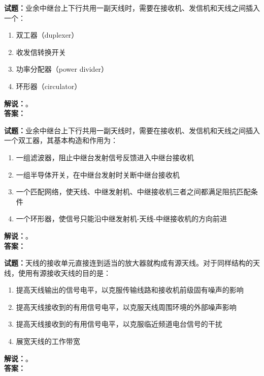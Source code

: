 \documentclass{ctexbook}
\begin{document}
\bigskip




\noindent\textbf{试题：}业余中继台上下行共用一副天线时，需要在接收机、发信机和天线之间插入一个：
\begin{enumerate}[leftmargin=3em]
\item 双工器（duplexer）
\item 收发信转换开关
\item 功率分配器（power divider）
\item 环形器（circulator）
\end{enumerate}
\noindent\textbf{解说：}\textbf{}。\\\noindent\textbf{答案：}

\bigskip




\noindent\textbf{试题：}业余中继台上下行共用一副天线时，需要在接收机、发信机和天线之间插入一个双工器，其基本构造和作用为：
\begin{enumerate}[leftmargin=3em]
\item 一组滤波器，阻止中继台发射信号反馈进入中继台接收机
\item 一组半导体开关，在中继台发射时关断中继台接收机
\item 一个匹配网络，使天线、中继发射机、中继接收机三者之间都满足阻抗匹配条件
\item 一个环形器，使信号只能沿中继发射机-天线-中继接收机的方向前进
\end{enumerate}
\noindent\textbf{解说：}\textbf{}。\\\noindent\textbf{答案：}

\bigskip




\noindent\textbf{试题：}天线的接收单元直接连到适当的放大器就构成有源天线。对于同样结构的天线，使用有源接收天线的目的是：
\begin{enumerate}[leftmargin=3em]
\item 提高天线输出的信号电平，以克服传输线路和接收机前级固有噪声的影响
\item 提高天线接收到的有用信号电平，以克服天线周围环境的外部噪声影响
\item 提高天线接收到的有用信号电平，以克服临近频道电台信号的干扰
\item 展宽天线的工作带宽
\end{enumerate}
\noindent\textbf{解说：}\textbf{}。\\\noindent\textbf{答案：}

\bigskip
\end{document}
